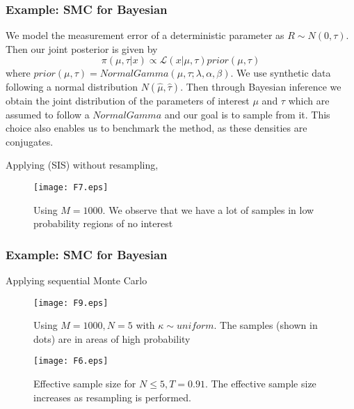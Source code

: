 \documentclass[aspectratio=169]{beamer}\usepackage[utf8]{inputenc}
\begin{document}
\begin{frame}\frametitle{Example: SMC for Bayesian }
We model the measurement error of a deterministic parameter as $R \sim N(0,\tau)$. Then our joint posterior is given by 
\begin{equation}
\pi (\mu, \tau| x ) \propto \mathcal{L}(x|\mu, \tau) prior(\mu , \tau)
\end{equation}
where  $prior(\mu , \tau)=NormalGamma(\mu, \tau; \lambda, \alpha, \beta)$. We use synthetic data  following a normal distribution $N(\hat{\mu}, \hat{\tau})$. Then through Bayesian  inference we obtain the joint distribution of the parameters of interest $\mu$ and $\tau$ which are assumed to follow a  $NormalGamma$ and our goal is to sample from it. This  choice also enables us to benchmark the method, as these densities are conjugates.

\end{frame}

\begin{frame}
Applying (SIS) without resampling,
\begin{figure}[h!]
	\centering
	\begin{minipage}{.60\textwidth}
		\centering
		\texttt{[image: F7.eps]}
		\caption{Using $M=1000$. We observe that we have a lot of samples in low probability regions of no interest  }
		\label{Ex1}
	\end{minipage}%
\end{figure}
\end{frame}

\begin{frame}\frametitle{Example: SMC for Bayesian }
Applying  sequential Monte Carlo
\begin{figure}[h!]
	\centering
	\begin{minipage}{.45\textwidth}
		\centering
		\texttt{[image: F9.eps]}
				\caption{Using $M=1000, N=5$ with  $ \kappa \sim uniform $. The samples (shown in dots) are in  areas of high probability  }
		\label{Ex1}
	\end{minipage}%
	\begin{minipage}{.05\textwidth}
	\end{minipage}
	\begin{minipage}{.45\textwidth}
		\centering
		\texttt{[image: F6.eps]}
		\caption{Effective sample size for $N\leq5, T=0.91$. The effective sample size  increases as resampling is performed.  }
		\label{Ex2}
	\end{minipage}
\end{figure}
\end{frame}
\end{document}
